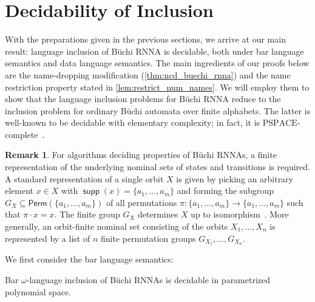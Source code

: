 \documentclass[final,a4paper,UKenglish,thm-restate,autoref,numberwithinsect]{lipics-v2021}
\renewcommand{\o}{\cdot}
\numberwithin{equation}{section}
\newcommand{\seq}{\subseteq}
\newcommand{\Perm}{\mathsf{Perm}}
\newcommand{\PSPACE}{\mathrm{PSPACE}}
\newcommand{\+}[1]{\mathcal{#1}\xspace}
\DeclareMathOperator{\supp}{\mathsf{supp}} %
\theoremstyle{definition}
\newtheorem{rem}[theorem]{Remark}
\begin{document}
\section{Decidability of Inclusion}\label{sec:decidability}
%
With the preparations given in the previous sections, we
arrive at our main result: language inclusion of Büchi RNNA is
decidable, both under bar language semantics and data language
semantics. The main ingredients of our proofs below are the
name-dropping modification (\autoref{thm:ncd_buechi_rnna}) and the
name restriction property stated in
\autoref{lem:restrict_num_names}. We will employ them to show that the
language inclusion problems for Büchi RNNA reduce to the inclusion
problem for ordinary Büchi automata over finite alphabets. The latter is
well-known to be decidable with elementary complexity; in fact, it is $\PSPACE$-complete~\cite{kv96}.
%
\begin{rem}
  For algorithms deciding properties of Büchi RNNAs, a finite
  representation of the underlying nominal sets of states and
  transitions is required. A standard representation of a single orbit
  $X$ is given by picking an arbitrary element $x\in X$ with
  $\supp(x)=\{a_1,\ldots, a_m\}$ and forming the subgroup
  $G_X\seq \Perm(\{a_1,\ldots,a_m\})$ of all permutations
  $\pi\colon \{a_1,\ldots, a_m\}\to \{a_1,\ldots, a_m\}$ such that
  $\pi\o x = x$. The finite group $G_X$ determines $X$ up to
  isomorphism~\cite[Thm. 5.13]{Pitts13}. More generally, an
  orbit-finite nominal set consisting of the orbits $X_1,\ldots, X_n$
  is represented by a list of $n$ finite permutation groups
  $G_{X_1},\ldots, G_{X_n}$.
\end{rem}
%
We first consider the bar language semantics:
%
\begin{theorem}\label{thm:inclusion_decidable}
  Bar $\omega$-language inclusion of Büchi RNNAs is decidable in parametrized
  polynomial space.
\end{theorem}
%
\end{document}
